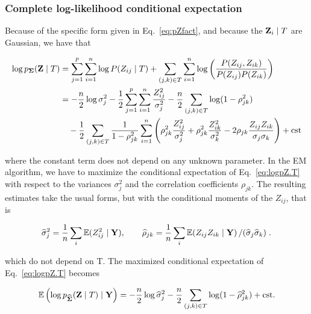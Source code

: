 \subsubsection*{Complete log-likelihood conditional expectation}
Because of the specific form given in Eq.~\eqref{eq:pZfact}, and because the ${\bf Z}_i\mid T$  are Gaussian, we have that
 
\begin{align}
    \label{eq:logpZ.T}
    \log{p_{\boldsymbol{\Sigma}}}({\bf Z} \mid T)
    & = \sum_{j=1}^p \sum_{i=1}^n \log P(Z_{ij} \mid T) 
    + \sum_{(j, k) \in T} \sum_{i=1}^n \log \left(\frac{P(Z_{ij}, Z_{ik})}{P(Z_{ij})P(Z_{ik})}\right) \nonumber \\
    & = - \frac{n}2 \log \sigma_j^2 -\frac12 \sum_{j=1}^p \sum_{i=1}^n \frac{Z_{ij}^2}{\sigma_j^2}
    - \frac{n}2 \sum_{(j, k) \in T} \log (1- \rho_{jk}^2) \\
    & \quad - \frac12 \sum_{(j, k) \in T} \frac1{1- \rho_{jk}^2} \sum_{i=1}^n \left(
    \rho^2_{jk} \frac{Z_{ij}^2}{\sigma_j^2} + \rho^2_{jk} \frac{Z_{ik}^2}{\sigma_k^2} - 2\rho_{jk} \frac{Z_{ij} Z_{ik}}{\sigma_j \sigma_k}
    \right)
    + \text{cst} \nonumber 
\end{align}
 

where the constant term does not depend on any unknown parameter. 
In the EM algorithm, we have to maximize the conditional expectation of Eq.~\eqref{eq:logpZ.T} with respect to the variances $\sigma_j^2$ and the correlation coefficients $\rho_{jk}$. The resulting estimates take the usual forms, but with the conditional moments of the $Z_{ij}$, that is
 
\begin{equation} \label{eq:sigma.rho}
\widehat{\sigma}_j^2  = \frac1n \sum_i \operatorname*{\mathbb{E}}(Z^2_{ij}  \mid  {\bf Y}),
\qquad
\widehat{\rho}_{jk}   = \frac1n \sum_i \operatorname*{\mathbb{E}}(Z_{ij} Z_{ik}  \mid  {\bf Y}) \left/ (\widehat{\sigma}_j \widehat{\sigma}_k) \right. .
\end{equation}
 
which do not depend on T. 
The maximized conditional expectation of Eq.~\eqref{eq:logpZ.T} becomes
 
\begin{equation} \label{eq:ElogpZ.T.Y}
    \operatorname*{\mathbb{E}}\left(\log p_{\widehat{{\boldsymbol{\Sigma}}}}({\bf Z} \mid T) \mid {\bf Y}\right)
    = - \frac{n}2 \log \widehat{\sigma}_j^2 
    - \frac{n}2 \sum_{(j, k) \in T} \log (1- \widehat{\rho}_{jk}^2)
    + \text{cst}.
\end{equation}
 
